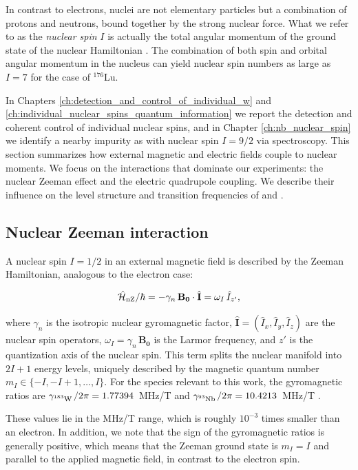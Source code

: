 In contrast to electrons, nuclei are not elementary particles but a combination of protons and neutrons, bound together by the strong nuclear force. What we refer to as the \textit{nuclear spin} $I$ is actually the total angular momentum of the ground state of the nuclear Hamiltonian . The combination of both spin and orbital angular momentum in the nucleus can yield nuclear spin numbers as large as $I=7$ for the case of $^{176}$Lu. 

In Chapters \ref{ch:detection_and_control_of_individual_w} and \ref{ch:individual_nuclear_spins_quantum_information} we report the detection and coherent control of individual \W nuclear spins, and in Chapter \ref{ch:nb_nuclear_spin} we identify a nearby impurity as \Nb with nuclear spin $I=9/2$ via spectroscopy. This section summarizes how external magnetic and electric fields couple to nuclear moments. We focus on the interactions that dominate our experiments: the nuclear Zeeman effect and the electric quadrupole coupling. We describe their influence on the level structure and transition frequencies of \W and \Nb.

\subsection{Nuclear Zeeman interaction}

A nuclear spin $I=1/2$ in an external magnetic field is described by the Zeeman Hamiltonian, analogous to the electron case:

\begin{equation}
    \hat{\mathcal{H}}_{\text{nZ}} / \hbar = -\gamma_n\, \mathbf{B_0}\cdot\hat{\mathbf{I}} = \omega_I \, \hat{I}_{z'},
\end{equation}

\noindent where $\gamma_n$ is the isotropic nuclear gyromagnetic factor, $\hat{\mathbf{I}}=(\hat{I}_x,\hat{I}_y,\hat{I}_z)$ are the nuclear spin operators, $\omega_I = \gamma_n\, \mathbf{B_0}$ is the Larmor frequency, and $z'$ is the quantization axis of the nuclear spin. This term splits the nuclear manifold into $2I + 1$ energy levels, uniquely described by the magnetic quantum number $m_I \in \{-I, -I+1, \dots, I\}$. For the species relevant to this work, the gyromagnetic ratios are $\gamma_{\text{$^{183}$W\,}}/2\pi = 1.77394$~MHz/T and $\gamma_{\text{$^{93}$Nb\,}}/2\pi = 10.4213$~MHz/T .

These values lie in the MHz/T range, which is roughly $10^{-3}$ times smaller than an electron. In addition, we note that the sign of the gyromagnetic ratios is generally positive, which means that the Zeeman ground state is $m_I=I$ and parallel to the applied magnetic field, in contrast to the electron spin.



